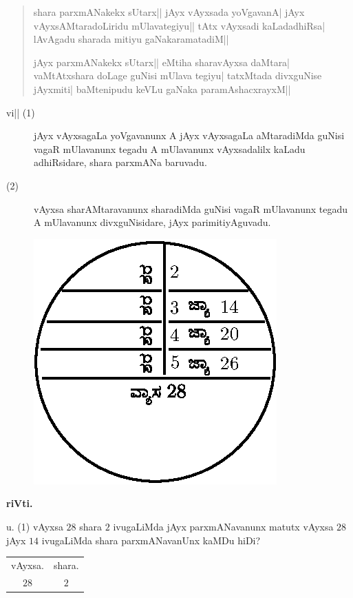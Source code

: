\begin{verse}
shara parxmANakekx sUtarx|| jAyx vAyxsada yoVgavanA| jAyx
vAyxsAMtaradoLiridu mUlavategiyu|| tAtx vAyxsadi kaLadadhiRsa|
lAvAgadu sharada mitiyu gaNakaramatadiM||

jAyx parxmANakekx sUtarx|| eMtiha sharavAyxsa daMtara| vaMtAtxshara
doLage guNisi mUlava tegiyu| tatxMtada divxguNise jAyxmiti|
baMtenipudu keVLu gaNaka paramAshacxrayxM||
\end{verse}

\begin{description}
\item[\textmd{vi||} \rm(1)]
jAyx vAyxsagaLa yoVgavanunx A jAyx vAyxsagaLa aMtaradiMda guNisi vagaR
mUlavanunx tegadu A mUlavanunx vAyxsadalilx kaLadu adhiRsidare, shara
parxmANa baruvadu.

\item[\rm(2)] vAyxsa sharAMtaravanunx sharadiMda guNisi vagaR
mUlavanunx tegadu A mUlavanunx divxguNisidare, jAyx parimitiyAguvadu. 
\end{description}

\begin{figure}[H]
\centering
\includegraphics{figure/fig37.eps}
\end{figure}

\begin{center}
{\bf riVti.}
\end{center}

u. {\rm(1)} vAyxsa $28$ shara $2$ ivugaLiMda jAyx parxmANavanunx
matutx vAyxsa $28$ jAyx $14$ ivugaLiMda shara parxmANavanUnx kaMDu
hiDi?

\medskip

\begin{tabular}{c@{\qquad}c}
vAyxsa. & shara.\\
$28$ & $2$
\end{tabular}
\smallskip

